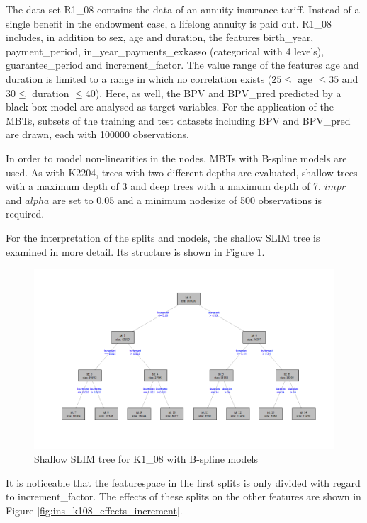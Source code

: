 The data set R1\_08 contains the data of an annuity insurance tariff. Instead of a single benefit in the endowment case, a lifelong annuity is paid out.
R1\_08 includes, in addition to sex, age and duration, the features birth\_year, payment\_period, in\_year\_payments\_exkasso (categorical with 4 levels), guarantee\_period and increment\_factor.
The value range of the features age and duration is limited to a range in which no correlation exists ($25 \leq$ age $\leq 35$ and $30 \leq$ duration $\leq 40$).
 Here, as well, the BPV and BPV\_pred predicted by a black box model are analysed as target variables.
For the application of the MBTs, subsets of the training and test datasets including BPV and BPV\_pred are drawn, each with 100000 observations.

In order to model non-linearities in the nodes, MBTs with B-spline models are used. As with K2204, trees with two different depths are evaluated, shallow trees with a maximum depth of 3 and deep trees with a maximum depth of 7. $impr$ and $alpha$ are set to 0.05 and a minimum nodesize of 500 observations is required.

For the interpretation of the splits and models, the shallow SLIM tree is examined in more detail. Its structure is shown in Figure \ref{fig:ins_k108_slim_bsplines_small_tree}.

\begin{figure}[!htb]
    \centering
    \includegraphics[width = 16cm]{Figures/insurance_use_case/k1_08_BPV/slim_bsplines_small_tree.png}
    \caption{Shallow SLIM tree for K1\_08 with B-spline models}
    \label{fig:ins_k108_slim_bsplines_small_tree}
\end{figure}


It is noticeable that the featurespace in the first splits is only divided with regard to increment\_factor. The effects of these splits on the other features are shown in Figure \ref{fig:ins_k108_effects_increment}.

